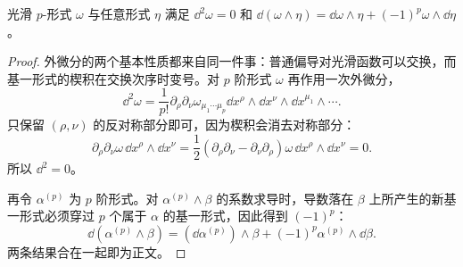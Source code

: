 \begin{proposition}
光滑 $p$-形式 $\omega$ 与任意形式 $\eta$ 满足 $\dd^2\omega=0$ 和 $\dd(\omega\wedge\eta)=\dd\omega\wedge\eta+(-1)^p\omega\wedge\dd\eta$。
\end{proposition}
\begin{proof}
外微分的两个基本性质都来自同一件事：普通偏导对光滑函数可以交换，而基一形式的楔积在交换次序时变号。对 $p$ 阶形式 $\omega$ 再作用一次外微分，
\begin{equation*}
 \dd^2 \omega
 =\frac1{p!}\partial_\rho\partial_\nu\omega_{\mu_1\cdots\mu_p}
 \dd x^\rho\wedge\dd x^\nu\wedge
 \dd x^{\mu_1}\wedge\cdots .
\end{equation*}
只保留 $(\rho,\nu)$ 的反对称部分即可，因为楔积会消去对称部分：
\begin{equation*}
 \partial_\rho\partial_\nu\omega\,
 \dd x^\rho\wedge\dd x^\nu
 =\frac12(\partial_\rho\partial_\nu-\partial_\nu\partial_\rho)\omega\,
 \dd x^\rho\wedge\dd x^\nu=0.
\end{equation*}
所以 $\dd^2=0$。

再令 $\alpha^{(p)}$ 为 $p$ 阶形式。对 $\alpha^{(p)}\wedge\beta$ 的系数求导时，导数落在 $\beta$ 上所产生的新基一形式必须穿过 $p$ 个属于 $\alpha$ 的基一形式，因此得到 $(-1)^p$：
\begin{equation*}
 \dd(\alpha^{(p)}\wedge\beta)
 =(\dd\alpha^{(p)})\wedge\beta
 +(-1)^p\alpha^{(p)}\wedge\dd\beta.
\end{equation*}
两条结果合在一起即为正文。
\end{proof}

